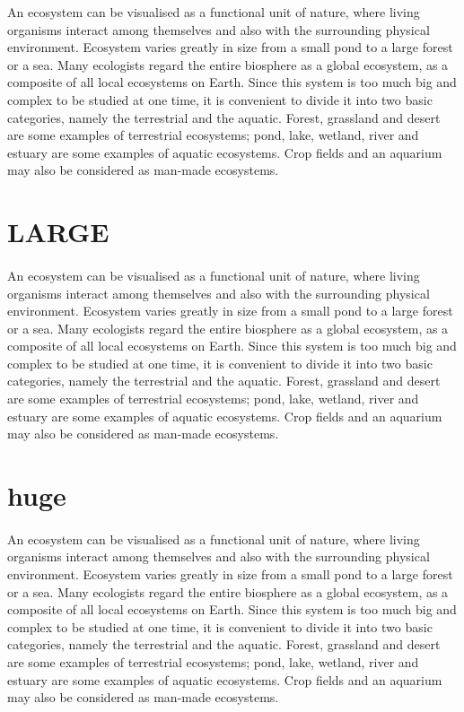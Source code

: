 \documentclass[12pt]{article}
\begin{document}
	{\Large An ecosystem can be visualised as a functional unit of nature, where living 
		organisms interact among themselves and also with the surrounding physical 
		environment. Ecosystem varies greatly in size from a small pond to a large forest or a 
		sea. Many ecologists regard the entire biosphere as a global ecosystem, as a composite 
		of all local ecosystems on Earth. Since this system is too much big and complex to be 
		studied at one time, it is convenient to divide it into two basic categories, namely the 
		terrestrial and the aquatic. Forest, grassland and desert are some examples of terrestrial 
		ecosystems; pond, lake, wetland, river and estuary are some examples of aquatic 
		ecosystems. Crop fields and an aquarium may also be considered as man-made 
		ecosystems. }
	
	\section{LARGE}
	\paragraph{}
	
	{\LARGE An ecosystem can be visualised as a functional unit of nature, where living 
		organisms interact among themselves and also with the surrounding physical 
		environment. Ecosystem varies greatly in size from a small pond to a large forest or a 
		sea. Many ecologists regard the entire biosphere as a global ecosystem, as a composite 
		of all local ecosystems on Earth. Since this system is too much big and complex to be 
		studied at one time, it is convenient to divide it into two basic categories, namely the 
		terrestrial and the aquatic. Forest, grassland and desert are some examples of terrestrial 
		ecosystems; pond, lake, wetland, river and estuary are some examples of aquatic 
		ecosystems. Crop fields and an aquarium may also be considered as man-made 
		ecosystems. }
	
	\section{huge}
	\paragraph{}
	
	{\huge An ecosystem can be visualised as a functional unit of nature, where living 
		organisms interact among themselves and also with the surrounding physical 
		environment. Ecosystem varies greatly in size from a small pond to a large forest or a 
		sea. Many ecologists regard the entire biosphere as a global ecosystem, as a composite 
		of all local ecosystems on Earth. Since this system is too much big and complex to be 
		studied at one time, it is convenient to divide it into two basic categories, namely the 
		terrestrial and the aquatic. Forest, grassland and desert are some examples of terrestrial 
		ecosystems; pond, lake, wetland, river and estuary are some examples of aquatic 
		ecosystems. Crop fields and an aquarium may also be considered as man-made 
		ecosystems. }
	
\end{document}
